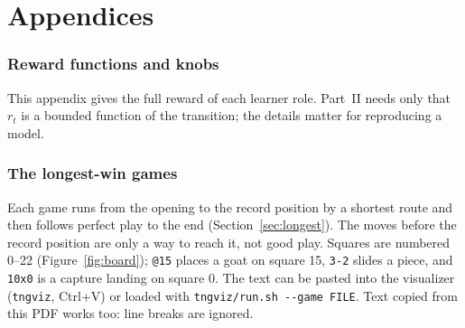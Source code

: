 \documentclass[11pt]{article}
\newcommand{\code}[1]{{\small\texttt{#1}}}
\theoremstyle{plain}
\theoremstyle{definition}
\theoremstyle{remark}
\begin{document}
\appendix
\part*{Appendices}
\section{Reward functions and knobs}\label{app:rewards}
This appendix gives the full reward of each learner role. Part~II needs only that $r_t$ is a bounded function
of the transition; the details matter for reproducing a model.


\section{The longest-win games}\label{app:games}
Each game runs from the opening to the record position by a shortest route and then follows perfect play to
the end (Section~\ref{sec:longest}). The moves before the record position are only a way to reach it, not good
play. Squares are numbered 0--22 (Figure~\ref{fig:board}); \code{@15} places a goat on square 15, \code{3-2} slides
a piece, and \code{10x0} is a capture landing on square 0. The text can be pasted into the visualizer
(\code{tngviz}, Ctrl+V) or loaded with \code{tngviz/run.sh -{}-game FILE}. Text copied from this PDF works too: line breaks are ignored.


\end{document}
